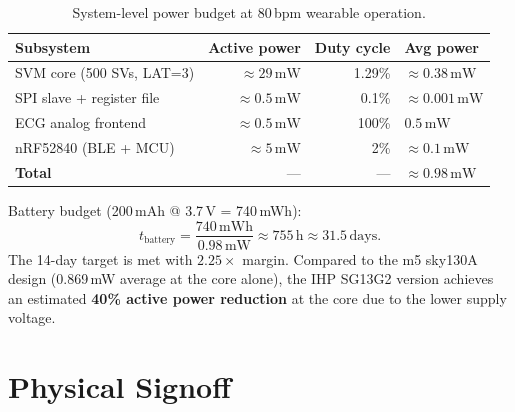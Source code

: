 \documentclass[11pt]{article}
\newcommand{\mW}{\,\mathrm{mW}}
\begin{document}
\begin{table}[H]
  \centering
  \caption{System-level power budget at 80\,bpm wearable operation.}
  \label{tab:syspower}
  \small
  \begin{tabular}{lrrl}
    \toprule
    Subsystem & Active power & Duty cycle & Avg power \\
    \midrule
    SVM core (500 SVs, LAT=3) & $\approx 29\mW$ & 1.29\% & $\approx 0.38\mW$ \\
    SPI slave + register file  & $\approx 0.5\mW$  & 0.1\%  & $\approx 0.001\mW$ \\
    ECG analog frontend        & $\approx 0.5\mW$  & 100\%  & $0.5\mW$ \\
    nRF52840 (BLE + MCU)       & $\approx 5\mW$    & 2\%    & $\approx 0.1\mW$ \\
    \midrule
    \textbf{Total} & --- & --- & $\approx\mathbf{0.98\mW}$ \\
    \bottomrule
  \end{tabular}
\end{table}

Battery budget (200\,mAh @ 3.7\,V = 740\,mWh):
\begin{equation}
  t_{\text{battery}} = \frac{740\,\mathrm{mWh}}{0.98\,\mathrm{mW}} \approx 755\,\mathrm{h} \approx 31.5\,\mathrm{days}.
  \label{eq:battery}
\end{equation}
The 14-day target is met with $2.25\times$ margin.  Compared to the m5 sky130A
design (0.869\,mW average at the core alone), the IHP SG13G2 version achieves an
estimated \textbf{40\% active power reduction} at the core due to the lower supply
voltage.

\section{Physical Signoff}
\end{document}
